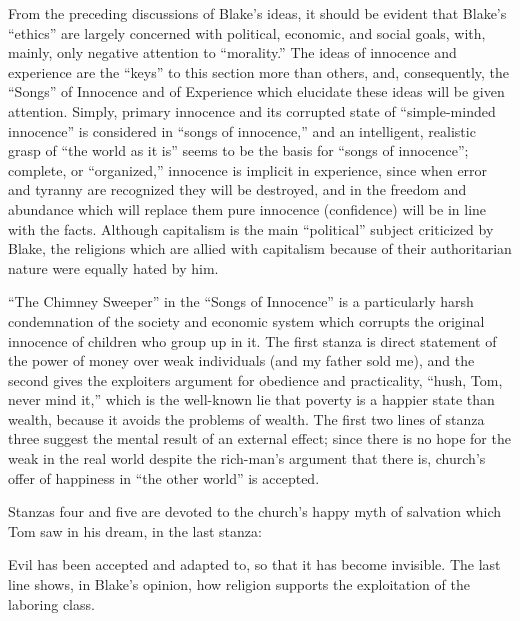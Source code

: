 From the preceding discussions of Blake's ideas, it should be evident that Blake's \enquote{ethics} are largely concerned with political,
economic, and social goals, with, mainly, only negative attention to \enquote{morality.} The ideas of innocence and experience are the \enquote{keys}
to this section more than others, and, consequently, the \enquote{Songs} of Innocence and of Experience which elucidate these ideas will be given attention. Simply, primary
innocence and its corrupted state of \enquote{simple-minded innocence} is considered in \enquote{songs of innocence,} and an intelligent, realistic grasp of \enquote{the world
as it is} seems to be the basis for \enquote{songs of innocence}; complete, or \enquote{organized,} innocence is implicit in experience,
since when error and tyranny are recognized they will be destroyed, and in the freedom and abundance which will replace them pure innocence
(confidence) will be in line with the facts. Although capitalism is the main \enquote{political} subject criticized by Blake,
the religions which are allied with capitalism because of their authoritarian nature were equally hated by him.

\enquote{The Chimney Sweeper} in the \enquote{Songs of Innocence} is a particularly harsh condemnation of the society and economic system
which corrupts the original innocence of children who group up in it. The first stanza is direct statement of the power of money
over weak individuals (and my father sold me), and the second gives the exploiters argument for obedience and practicality, \enquote{hush, Tom, never mind it,} which
is the well-known lie that poverty is a happier state than wealth, because it avoids the problems of wealth. The first two lines
of stanza three suggest the mental result of an external effect; since there is no hope for the weak in the real world despite the rich-man's argument
that there is, church's offer of happiness in \enquote{the other world} is accepted.

Stanzas four and five are devoted to the church's happy myth of salvation which Tom saw in his dream, in the last stanza:


Evil has been accepted and adapted to, so that it has become invisible. The last line shows, in Blake's opinion, how
religion supports the exploitation of the laboring class.

